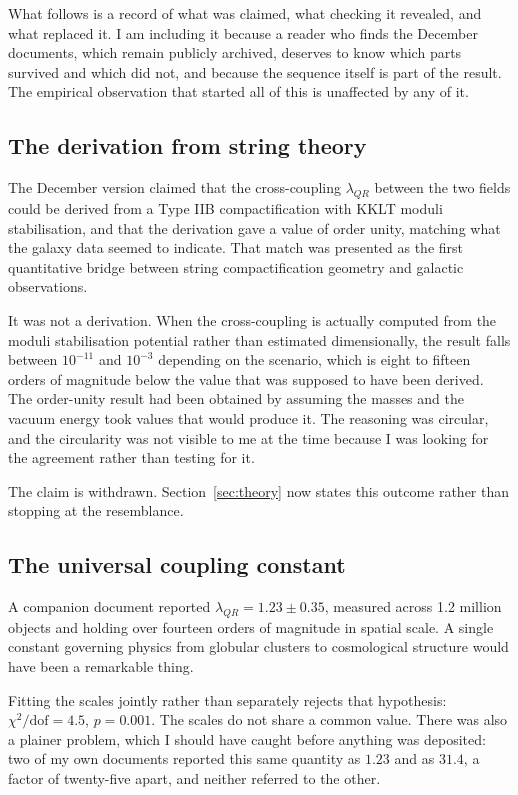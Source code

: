 \documentclass[12pt,a4paper]{article}
\begin{document}
What follows is a record of what was claimed, what checking it revealed, and what replaced it. I am including it because a reader who finds the December documents, which remain publicly archived, deserves to know which parts survived and which did not, and because the sequence itself is part of the result. The empirical observation that started all of this is unaffected by any of it.

\subsection{The derivation from string theory}

The December version claimed that the cross-coupling $\lambda_{QR}$ between the two fields could be derived from a Type IIB compactification with KKLT moduli stabilisation, and that the derivation gave a value of order unity, matching what the galaxy data seemed to indicate. That match was presented as the first quantitative bridge between string compactification geometry and galactic observations.

It was not a derivation. When the cross-coupling is actually computed from the moduli stabilisation potential rather than estimated dimensionally, the result falls between $10^{-11}$ and $10^{-3}$ depending on the scenario, which is eight to fifteen orders of magnitude below the value that was supposed to have been derived. The order-unity result had been obtained by assuming the masses and the vacuum energy took values that would produce it. The reasoning was circular, and the circularity was not visible to me at the time because I was looking for the agreement rather than testing for it.

The claim is withdrawn. Section~\ref{sec:theory} now states this outcome rather than stopping at the resemblance.

\subsection{The universal coupling constant}

A companion document reported $\lambda_{QR} = 1.23 \pm 0.35$, measured across 1.2 million objects and holding over fourteen orders of magnitude in spatial scale. A single constant governing physics from globular clusters to cosmological structure would have been a remarkable thing.

Fitting the scales jointly rather than separately rejects that hypothesis: $\chi^2/\mathrm{dof} = 4.5$, $p = 0.001$. The scales do not share a common value. There was also a plainer problem, which I should have caught before anything was deposited: two of my own documents reported this same quantity as $1.23$ and as $31.4$, a factor of twenty-five apart, and neither referred to the other.
\end{document}
